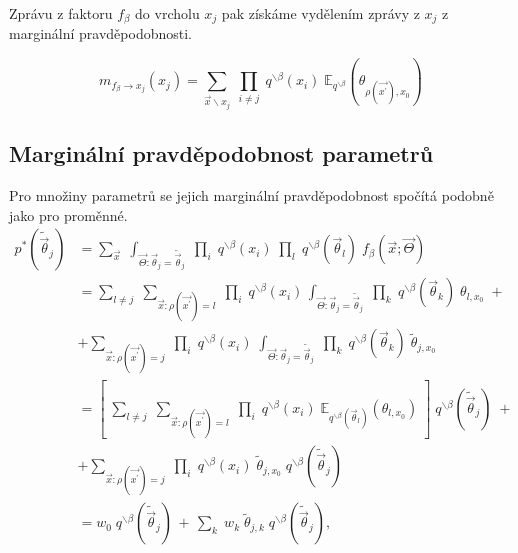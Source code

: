 Zprávu z faktoru $f_\beta$ do vrcholu $x_j$ pak získáme vydělením zprávy z $x_j$ z
marginální pravděpodobnosti.

\begin{equation}
m_{f_\beta \rightarrow x_j}(x_j) =
    \sum_{\vec{x} \backslash x_j} \;
        \prod_{i \ne j}\;
            q^{\backslash \beta}(x_i)\;
            \mathbb{E}_{q^{\backslash \beta}}
                (\theta_{\rho(\vec{x^\prime}), x_0})
\label{eq:msgfromftox}
\end{equation}

\subsection{Marginální pravděpodobnost parametrů}

Pro množiny parametrů se jejich marginální pravděpodobnost spočítá podobně jako
pro proměnné.
\begin{align}
p^*(\tilde{\vec{\theta}}_j) & = 
    \sum_{\vec{x}} \; 
    \int_{\vec{\Theta}: \vec{\theta}_j = \tilde{\vec{\theta}}_j} \;
         \prod_i \;
             q^{\backslash \beta}(x_i) \;
         \prod_l \;
    q^{\backslash \beta}(\vec{\theta}_l) \;
    f_\beta(\vec{x}; \vec{\Theta}) \label{eq:ep:theta_1}
\\
& = 
    \sum_{l \ne j} \;
        \sum_{\vec{x}: \rho(\vec{x^\prime}) = l} \;
            \prod_i \;
                q^{\backslash \beta}(x_i) \,
                \int_{\vec{\Theta}: \vec{\theta}_j = \tilde{\vec{\theta}}_j} \;
                    \prod_k \;
                        q^{\backslash \beta}(\vec{\theta}_k) \;
                        \theta_{l, x_0}\; + \label{eq:ep:theta_2}
\\
& + 
    \sum_{\vec{x}: \rho(\vec{x^\prime}) = j} \;
        \prod_i \;
            q^{\backslash \beta}(x_i) \;
            \int_{\vec{\Theta}: \vec{\theta}_j = \tilde{\vec{\theta}}_j} \;
                \prod_k \;
                    q^{\backslash \beta}(\vec{\theta}_k) \; 
                    \tilde{\theta}_{j, x_0}
\nonumber
\\
& = 
    \left[ \;
        \sum_{l \ne j} \;
            \sum_{\vec{x}: \rho(\vec{x^\prime}) = l} \;
                \prod_i \;
                    q^{\backslash \beta}(x_i) \;
                    \mathbb{E}_{q^{\backslash \beta}(\vec{\theta}_l)} (\theta_{l, x_0}) \;
    \right] \;
    q^{\backslash \beta}(\tilde{\vec{\theta}}_j) \; + \label{eq:ep:theta_3}
\\
& + 
    \sum_{\vec{x}: \rho(\vec{x^\prime}) = j} \;
        \prod_i \;
            q^{\backslash \beta}(x_i) \;
            \tilde{\theta}_{j,x_0} \;
            q^{\backslash \beta}(\tilde{\vec{\theta}}_j) \;
\label{eq:ep:theta_4}
\nonumber
\\
& = w_0 \; q^{\backslash \beta}(\tilde{\vec{\theta}}_j) \, + \, \sum_k \; w_k \;
    \tilde{\theta}_{j,k} \; q^{\backslash \beta}(\tilde{\vec{\theta}}_j),
\end{align}

